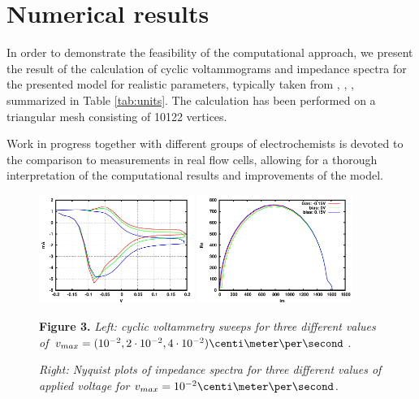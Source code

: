\documentclass[english,nofirstpagebreak,empty]{amsproc}
\begin{document}
\section{Numerical results}

In order to demonstrate the feasibility of the computational approach,
we present the  result of the calculation of  cyclic voltammograms and
impedance spectra  for the  presented model for  realistic parameters,
typically     taken    from    \cite{DivisekFuhrmannGaertnerJung2003},
\cite{HamannVielstich1998}, \cite{FuhrmannZhaoHolzbecherLangmach2008},
summarized  in  Table   \ref{tab:units}.   The  calculation  has  been
performed on a triangular mesh consisting of 10122 vertices.  

Work  in progress  together with  different groups  of electrochemists
\cite{FuhrmannZhaoEtAl2008xUlm}  is  devoted   to  the  comparison  to
measurements   in   real  flow   cells,   allowing   for  a   thorough
interpretation of  the computational  results and improvements  of the
model.

\begin{figure}[t]
  \centering
  \label{fig:numres}
  \includegraphics[width=0.45\textwidth]{test-cv}
  \includegraphics[width=0.45\textwidth]{test-ny}

  {\small \textbf{Figure 3.} \emph{Left: cyclic voltammetry  sweeps for three different values
of                                                             $v_{max}=
(10^{-2}, 2\cdot10^{-2}, 4\cdot10^{-2})\centi\meter\per\second$.}

\emph{ Right:
Nyquist  plots  of impedance  spectra  for  three  different values  of
applied voltage for $v_{max}=10^{-2}\centi\meter\per\second$.}}
\end{figure}



\end{document}

